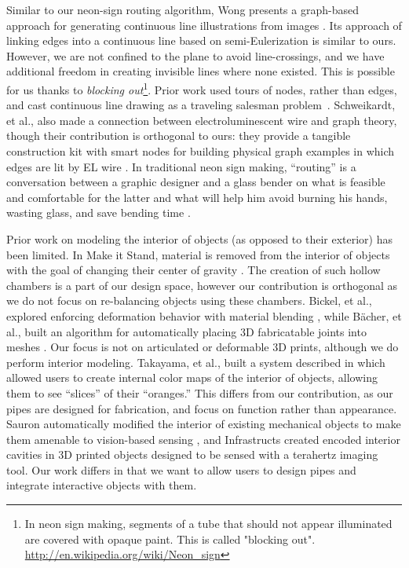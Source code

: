 Similar to our neon-sign routing algorithm, Wong presents a graph-based approach for generating continuous line illustrations from images \cite{Wong-continuousline}. Its approach of linking edges into a continuous line based on semi-Eulerization is similar to ours.  However, we are not confined to the plane to avoid line-crossings, and we have additional freedom in creating invisible lines where none existed.  This is possible for us thanks to \emph{blocking out}\footnote{In neon sign making, segments of a tube that should not appear illuminated are covered with opaque paint. This is called "blocking out". \url{http://en.wikipedia.org/wiki/Neon_sign}}. Prior work used tours of nodes, rather than edges, and cast continuous line drawing as a traveling salesman problem~\cite{Bosch-tsp}.  Schweikardt, et al., also made a connection between electroluminescent wire and graph theory, though their contribution is orthogonal to ours: they provide a tangible construction kit with smart nodes for building physical graph examples in which edges are lit by EL wire \cite{Schweikardt-tei09}.  In traditional neon sign making, ``routing'' is a conversation between a graphic designer and a glass bender on what is feasible and comfortable for the latter and what will help him avoid burning his hands, wasting glass, and save bending time \cite{strattman1997neon}.

Prior work on modeling the interior of objects (as opposed to their exterior) has been limited.  In Make it Stand, material is removed from the interior of objects with the goal of changing their center of gravity \cite{Prevost-makeitstand}.  The creation of such hollow chambers is a part of our design space, however our contribution is orthogonal as we do not focus on re-balancing objects using these chambers.  Bickel, et al., explored enforcing deformation behavior with material blending \cite{Bickel-deformation}, while B\"{a}cher, et al., built an algorithm for automatically placing 3D fabricatable joints into meshes \cite{Bacher-articulated}.  Our focus is not on articulated or deformable 3D prints, although we do perform interior modeling.  Takayama, et al., built a system described in \cite{Takayama-fruit} which allowed users to create internal color maps of the interior of objects, allowing them to see ``slices'' of their ``oranges.''  This differs from our contribution, as our pipes are designed for fabrication, and focus on function rather than appearance.  Sauron automatically modified the interior of existing mechanical objects to make them amenable to vision-based sensing \cite{Savage-sauron}, and Infrastructs created encoded interior cavities in 3D printed objects designed to be sensed with a terahertz imaging tool.  Our work differs in that we want to allow users to design pipes and integrate interactive objects with them.